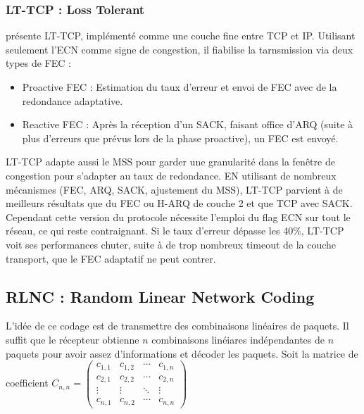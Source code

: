 \documentclass[frenchb]{article}
\begin{document}
\subsubsection{LT-TCP : Loss Tolerant}
\cite{lt-tcp} présente LT-TCP, implémenté comme une couche fine entre TCP et IP. Utilisant seulement l'ECN comme signe de congestion, il fiabilise la tarnsmission via deux types de FEC :
\begin{itemize}
\item Proactive FEC : Estimation du taux d'erreur et envoi de FEC avec de la redondance adaptative.
\item Reactive FEC : Après la réception d'un SACK, faisant office d'ARQ (suite à plus d'erreurs que prévus lors de la phase proactive), un FEC est envoyé.
\end{itemize}
LT-TCP adapte aussi le MSS pour garder une granularité dans la fenêtre de congestion pour s'adapter au taux de redondance.
EN utilisant de nombreux mécanismes (FEC, ARQ, SACK, ajustement du MSS), LT-TCP parvient à de meilleurs résultats que du FEC ou H-ARQ de couche 2 et que TCP avec SACK.
Cependant cette version du protocole nécessite l'emploi du flag ECN sur tout le réseau, ce qui reste contraignant. Si le taux d'erreur dépasse les 40\%, LT-TCP voit ses performances chuter, suite à de trop nombreux timeout de la couche transport, que le FEC adaptatif ne peut contrer.


\subsection{RLNC : Random Linear Network Coding}
\label{RLNC}
L'idée de ce codage est de transmettre des combinaisons linéaires de paquets. Il suffit que le récepteur obtienne $n$ combinaisons linéiares indépendantes de $n$ paquets pour avoir assez d'informations et décoder les paquets.
Soit la matrice de coefficient $C_{n,n} =
 \begin{pmatrix}
  c_{1,1} & c_{1,2} & \cdots & c_{1,n} \\
  c_{2,1} & c_{2,2} & \cdots & c_{2,n} \\
  \vdots  & \vdots  & \ddots & \vdots  \\
  c_{n,1} & c_{n,2} & \cdots & c_{n,n}
 \end{pmatrix}$
\end{document}
